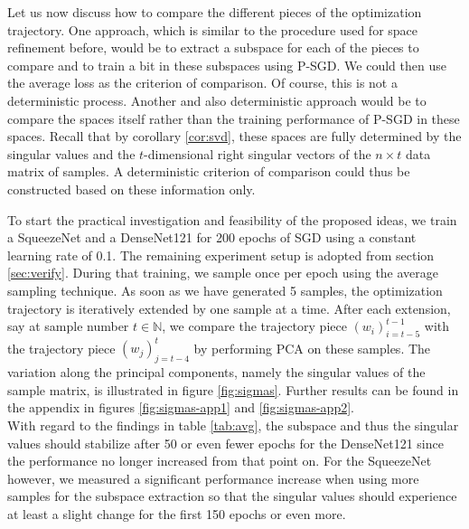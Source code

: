 \documentclass[11pt, a4paper]{article}
\newcommand{\N}{\mathbb{N}}
\begin{document}
Let us now discuss how to compare the different pieces of the optimization trajectory. One approach, which is similar to the procedure used for space refinement before, would be to extract a subspace for each of the pieces to compare and to train a bit in these subspaces using P-SGD. We could then use the average loss as the criterion of comparison. Of course, this is not a deterministic process. Another and also deterministic approach would be to compare the spaces itself rather than the training performance of P-SGD in these spaces. Recall that by corollary \ref{cor:svd}, these spaces are fully determined by the singular values and the $t$-dimensional right singular vectors of the $n \times t$ data matrix of samples. A deterministic criterion of comparison could thus be constructed based on these information only.

To start the practical investigation and feasibility of the proposed ideas, we train a SqueezeNet and a DenseNet121 for 200 epochs of SGD using a constant learning rate of 0.1. The remaining experiment setup is adopted from section \ref{sec:verify}. During that training, we sample once per epoch using the average sampling technique. As soon as we have generated 5 samples, the optimization trajectory is iteratively extended by one sample at a time. After each extension, say at sample number $t \in \N$, we compare the trajectory piece $(w_i)_{i=t-5}^{t-1}$ with the trajectory piece $(w_j)_{j=t-4}^{t}$ by performing PCA on these samples. The variation along the principal components, namely the singular values of the sample matrix, is illustrated in figure \ref{fig:sigmas}. Further results can be found in the appendix in figures \ref{fig:sigmas-app1} and \ref{fig:sigmas-app2}. \\

With regard to the findings in table \ref{tab:avg}, the subspace and thus the singular values should stabilize after 50 or even fewer epochs for the DenseNet121 since the performance no longer increased from that point on. For the SqueezeNet however, we measured a significant performance increase when using more samples for the subspace extraction so that the singular values should experience at least a slight change for the first 150 epochs or even more.
\end{document}
